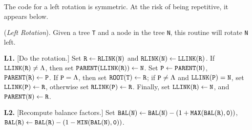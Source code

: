 \parindent=0pt

\medskip
The code for a left rotation is symmetric. At the risk of being repetitive, it
appears below.
\medskip

 ({\it Left Rotation}).
Given a tree {\tt T} and a node in the tree {\tt N}, this routine will rotate
{\tt N} left.

\parindent=36pt
\item{\bf L1.} [Do the rotation.]
Set
${\tt R} \gets {\tt RLINK(N)}$ and
${\tt RLINK(N)} \gets {\tt LLINK(R)}$.
If ${\tt LLINK(R)} \neq \Lambda$,
then set ${\tt PARENT(LLINK(R))} \gets {\tt N}$.
Set ${\tt P} \gets {\tt PARENT(N)}$, ${\tt PARENT(R)} \gets {\tt P}$.
If ${\tt P} = \Lambda$, then set ${\tt ROOT(T)} \gets {\tt R}$;
if ${\tt P} \neq \Lambda$ and ${\tt LLINK(P)} = {\tt N}$,
set ${\tt LLINK(P)} \gets {\tt R}$, otherwise
set ${\tt RLINK(P)} \gets {\tt R}$.
Finally, set ${\tt LLINK(R)} \gets {\tt N}$,
and ${\tt PARENT(N)} \gets {\tt R}$.

\item{\bf L2.} [Recompute balance factors.]
Set
${\tt BAL(N)} \gets {\tt BAL(N)} - (1 + {\tt MAX(BAL(R), 0)})$,
${\tt BAL(R)} \gets {\tt BAL(R)} - (1 - {\tt MIN(BAL(N), 0)})$.

\parindent=0pt

\bye
